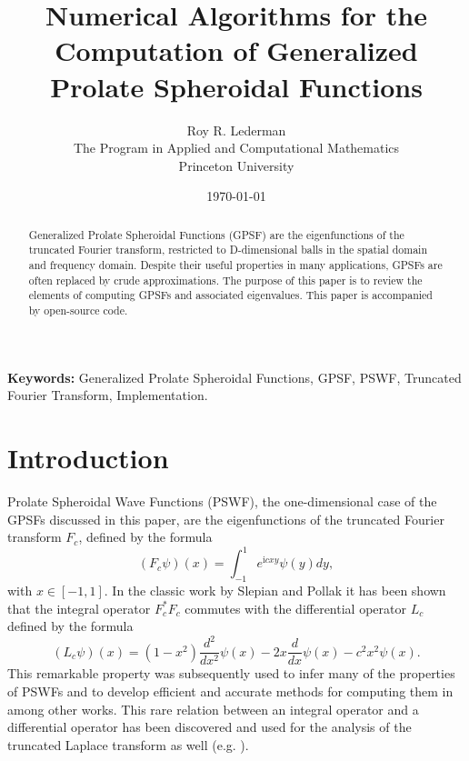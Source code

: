 \documentclass[12pt]{article}
\title{Numerical Algorithms for the Computation of Generalized Prolate Spheroidal Functions}
\date{\today}
\author{Roy R. Lederman\\ \small The Program in Applied and Computational Mathematics\\ \small Princeton University}
\begin{document}
\maketitle


%
%
%
\begin{abstract}
  Generalized Prolate Spheroidal Functions (GPSF) are the eigenfunctions of the truncated Fourier transform, restricted to D-dimensional balls in the spatial domain and frequency domain. Despite their useful properties in many applications, GPSFs are often replaced by crude approximations. 
  The purpose of this paper is to review the elements of computing GPSFs and associated eigenvalues.
  This paper is accompanied by open-source code.   
  \end{abstract}
{\bf Keywords:} Generalized Prolate Spheroidal Functions, GPSF, PSWF, Truncated Fourier Transform, Implementation.


%
%


\section{Introduction}\label{sec:intro}

Prolate Spheroidal Wave Functions (PSWF), the one-dimensional case of the GPSFs discussed in this paper, 
are the eigenfunctions of the truncated Fourier transform $F_c$, defined by the formula
\begin{equation}
  \left(F_c\psi\right)(x)   = \int_{-1}^1 e^{\mathrm{i} cxy} \psi(y) dy ,
\end{equation}
with $x \in [-1,1]$. 
In the classic work \cite{slepian1961prolate} by Slepian and Pollak it has been shown that the integral operator $F_c ^*F_c$ 
commutes with the differential operator $L_c$ defined by the formula
\begin{equation}
   \left(L_c\psi\right)(x) = (1-x^2) \frac{d^2}{dx^2}\psi(x) - 2x \frac{d}{dx}\psi(x) -c^2 x^2 \psi(x).
\end{equation}
This remarkable property was subsequently used to infer many of the properties of PSWFs and to develop efficient and accurate methods for computing them in \cite{slepian1961prolate,xiao2001prolate,xiao2003high,rokhlin2007approximate,osipov2013prolate,lederman2017lower} among other works. 
This rare relation between an integral operator and a differential operator has been discovered and used for the analysis of the truncated Laplace transform as well (e.g. \cite{bertero1985commuting,LedermanLaplace2,lederman2017lower}).
\end{document}
